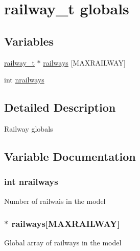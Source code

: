 \hypertarget{group__railway__t__globals}{\section{railway\-\_\-t globals}
\label{group__railway__t__globals}
}
\subsection*{Variables}
\begin{DoxyCompactItemize}
\item 
\hyperlink{structrailway__t}{railway\-\_\-t} $\ast$ \hyperlink{group__railway__t__globals_gaa4fac897105182cb0daa7953375d7e09}{railways} \mbox{[}M\-A\-X\-R\-A\-I\-L\-W\-A\-Y\mbox{]}
\item 
int \hyperlink{group__railway__t__globals_ga111eda200b72aa71b44357d6dac97f31}{nrailways}
\end{DoxyCompactItemize}


\subsection{Detailed Description}
Railway globals 

\subsection{Variable Documentation}
\hypertarget{group__railway__t__globals_ga111eda200b72aa71b44357d6dac97f31}{
\subsubsection[{nrailways}]{\setlength{\rightskip}{0pt plus 5cm}int nrailways}}\label{group__railway__t__globals_ga111eda200b72aa71b44357d6dac97f31}
Number of railwais in the model \hypertarget{group__railway__t__globals_gaa4fac897105182cb0daa7953375d7e09}{
\subsubsection[{railways}]{$\ast$ railways\mbox{[}M\-A\-X\-R\-A\-I\-L\-W\-A\-Y\mbox{]}}}\label{group__railway__t__globals_gaa4fac897105182cb0daa7953375d7e09}
Global array of railways in the model 